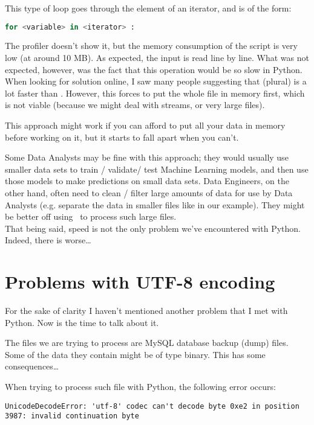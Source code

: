 This type of loop goes through the element of an iterator, and is of the form:
\begin{lstlisting}[language=python]
for <variable> in <iterator> :
\end{lstlisting}


The profiler doesn't show it, but the memory consumption of the script is very low (at around 10 MB). As expected, the input is read line by line. What was not expected, however, was the fact that this operation would be so slow in Python. \\


When looking for solution online, I saw many people suggesting that  (plural) is a lot faster than . However, this forces to put the whole file in memory first, which is not viable (because we might deal with streams, or very large files).


This approach might work if you can afford to put all your data in memory before working on it, but it starts to fall apart when you can't. 

Some Data Analysts may be fine with this approach; they would usually use smaller data sets to train / validate/ test Machine Learning models, and then use those models to make predictions on small data sets.
Data Engineers, on the other hand, often need to clean / filter large amounts of data for use by Data Analysts (e.g. separate the data in smaller files like in our example). They might be better off using \awk\ to process such large files. \\

That being said, speed is not the only problem we've encountered with Python.
Indeed, there is worse\dots


\section*{Problems with UTF-8 encoding}

For the sake of clarity I haven't mentioned another problem that I met with Python. Now is the time to talk about it.

The files we are trying to process are MySQL database backup (dump) files. Some of the data they contain might be of type binary. This has some consequences\dots

When trying to process such file with Python, the following error occurs:
\begin{lstlisting}
UnicodeDecodeError: 'utf-8' codec can't decode byte 0xe2 in position 3987: invalid continuation byte
\end{lstlisting}


